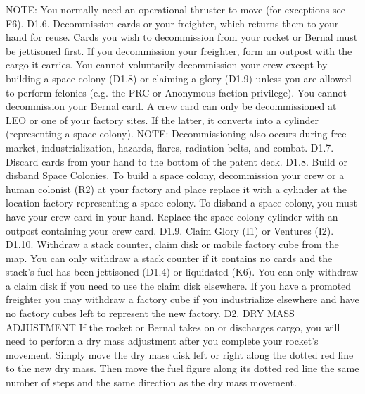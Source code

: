 \documentclass[a4paper]{book}
\begin{document}
NOTE: You normally need an operational thruster to move (for exceptions see F6).
D1.6. Decommission cards or your freighter, which returns them to your hand for reuse. Cards you wish to decommission from your rocket or Bernal must be jettisoned first. If you decommission your freighter, form an outpost with the cargo it carries. You cannot voluntarily decommission your crew except by building a space colony (D1.8) or claiming a glory (D1.9) unless you are allowed to perform felonies (e.g. the PRC or Anonymous faction privilege). You cannot decommission your Bernal card. A crew card can only be decommissioned at LEO or one of your factory sites. If the latter, it converts into a cylinder (representing a space colony).
NOTE: Decommissioning also occurs during free market, industrialization, hazards, flares, radiation belts, and combat.
D1.7. Discard cards from your hand to the bottom of the patent deck.
D1.8. Build or disband Space Colonies. To build a space colony, decommission your crew or a human colonist (R2) at your factory and place replace it with a cylinder at the location factory representing a space colony. To disband a space colony, you must have your crew card in your hand. Replace the space colony cylinder with an outpost containing your crew card.
D1.9. Claim Glory (I1) or Ventures (I2).
D1.10. Withdraw a stack counter, claim disk or mobile factory cube from the map. You can only withdraw a stack counter if it contains no cards and the stack’s fuel has been jettisoned (D1.4) or liquidated (K6). You can only withdraw a claim disk if you need to use the claim disk elsewhere. If you have a promoted freighter you may withdraw a factory cube if you industrialize elsewhere and have no factory cubes left to represent the new factory.
D2. DRY MASS ADJUSTMENT
If the rocket or Bernal takes on or discharges cargo, you will need to perform a dry mass adjustment after you complete your rocket’s movement. Simply move the dry mass disk left or right along the dotted red line to the new dry mass. Then move the fuel figure along its dotted red line the same number of steps and the same direction as the dry mass movement.
\end{document}
